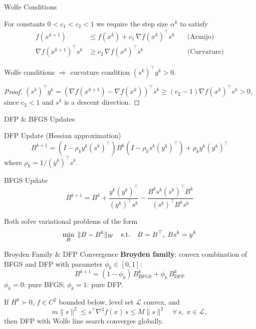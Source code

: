 \documentclass[10pt,aspectratio=169]{beamer}
\newcommand{\st}{\textnormal{s.t.}}
\begin{document}
\begin{frame}{Wolfe Conditions}
\begin{definition}
For constants $0<c_1<c_2<1$ we require the step size $\alpha^k$ to satisfy
\begin{align*}
    f(x^{k+1}) &\leq f(x^k) + c_1\,\nabla f(x^k)^\top s^k \quad &\text{(Armijo)}\\
    \nabla f(x^{k+1})^\top s^k &\geq c_2\,\nabla f(x^k)^\top s^k \quad &\text{(Curvature)}
\end{align*}
\end{definition}
\medskip
\begin{lemma}
Wolfe conditions $\Longrightarrow$ curvature condition $(s^k)^\top y^k > 0$.
\end{lemma}
\begin{proof}
$(s^k)^\top y^k = (\nabla f(x^{k+1}) - \nabla f(x^k))^\top s^k \geq (c_2-1)\nabla f(x^k)^\top s^k > 0$, since $c_2<1$ and $s^k$ is a descent direction.
\end{proof}
\end{frame}

\begin{frame}{DFP \& BFGS Updates}
\begin{block}{DFP Update (Hessian approximation)}
$$B^{k+1} = \left(I - \rho_k y^k(s^k)^\top\right)B^k\left(I - \rho_k s^k(y^k)^\top\right) + \rho_k y^k(y^k)^\top$$
where $\rho_k = 1/(y^k)^\top s^k$.
\end{block}

\begin{block}{BFGS Update}
$$B^{k+1} = B^k + \frac{y^k(y^k)^\top}{(y^k)^\top s^k} - \frac{B^ks^k(s^k)^\top B^k}{(s^k)^\top B^ks^k}$$
\end{block}

Both solve variational problems of the form
$$\min_{B}\;\|B - B^k\|_W \quad\st\quad B=B^\top,\; Bs^k = y^k$$
\end{frame}

\begin{frame}{Broyden Family \& DFP Convergence}
\textbf{Broyden family}: convex combination of BFGS and DFP with parameter $\phi_k\in[0,1]$:
$$B^{k+1} = (1-\phi_k)\,B^k_{\mathrm{BFGS}} + \phi_k\,B^k_{\mathrm{DFP}}$$
$\phi_k=0$: pure BFGS; \quad $\phi_k=1$: pure DFP.

\bigskip
\begin{theorem}[Yuan, 1995]
If $H^0\succ 0$, $f\in C^2$ bounded below, level set $\mathcal{L}$ convex, and
$$m\|s\|^2 \leq s^\top\nabla^2 f(x)\,s \leq M\|s\|^2 \quad\forall\, s,\; x\in\mathcal{L},$$
then DFP with Wolfe line search converges globally.
\end{theorem}
\end{frame}
\end{document}
